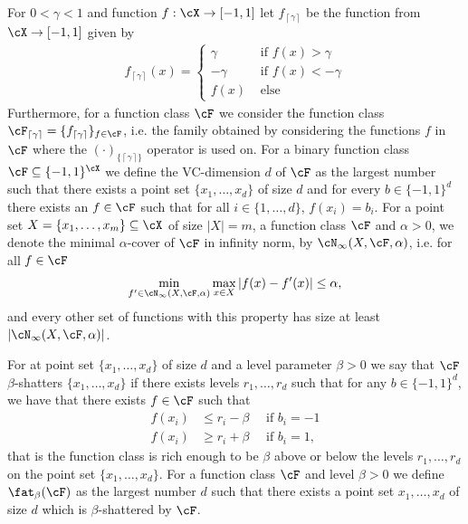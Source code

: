 For $0< \gamma <1$ and function $ f:\cX\rightarrow [-1,1] $ let $ f_{\left\lceil\gamma\right\rceil} $ be the function from $ \cX\rightarrow [-1,1] $ given by
    \begin{align}
        f_{\left\lceil\gamma\right\rceil}(x)=\begin{cases}
            \gamma &\text{ if }f(x)> \gamma
            \\
            -\gamma &\text{ if } f(x)<- \gamma
            \\
            f(x) &\text{ else }
        \end{cases}
    \end{align}   
    Furthermore, for a function class $ \cF $ we  consider the function class $ \cF_{\left\lceil\gamma\right\rceil} =\{  f_{\left\lceil\gamma\right\rceil}\}_{f\in \cF}$, i.e. the family obtained by considering the functions $ f $  in $ \cF $ where the $ (\cdot)_{\{ \left\lceil\gamma\right\rceil \}} $  operator is used on.
    For a binary function class $ \cF\subseteq \{  -1,1\}^{\cX}  $ we define the VC-dimension $ d $ of $ \cF $ as the largest number such that there exists a point set $ \{  x_{1},\ldots,x_{d}\}  $ of size $ d $ and for every $ b\in \{  -1,1\}^{d}  $ there exists an $ f\in\cF $ such that for all $ i\in\{  1,\ldots,d\}  $,  $ f(x_{i}) =b_{i}$.      
    For a point set $ X=\{  x_{1},\ldots,x_{m}\}  \subseteq \cX $ of size $ |X|=m $, a function class $ \cF $ and $ \alpha>0 $,  we denote the minimal $ \alpha$-cover of $ \cF $ in infinity norm, by $\cN_{\infty}(X,\cF ,\alpha)  $, i.e. for all $ f\in \cF $ 
    \begin{align}
        \min_{f'\in\cN_{\infty}(X,\cF ,\alpha)   }\max_{x\in X}  \left| f(x)-f'(x) \right| \leq \alpha, 
    \end{align}
    and every other set of functions with this property has size at least $  \left| \cN_{\infty}(X,\cF ,\alpha)  \right|  $.

    For at point set $\{  x_{1},\ldots,x_d\} $ of size $ d $ and a level parameter $ \beta>0 $ we say that $ \cF $ $ \beta $-shatters     $ \{  x_{1},\ldots,x_d\} $ if there exists levels $ r_1,\ldots,r_{d} $ such that for any $ b\in \{  -1,1\}^{d} $, we have that there exists $ f\in \cF $ such that 
    \begin{align*}
        f(x_i)&\leq r_{i}-\beta  \quad \text{ if  } b_{i}=-1
        \\
        f(x_i)&\geq r_{i}+\beta  \quad \text{ if  } b_{i}=1,
    \end{align*}
    that is the function class is rich enough to be $ \beta $  above or below the levels $ r_{1},\ldots,r_{d} $ on the point set $ \{  x_{1},\ldots,x_d\}.$  
    For a function class $ \cF $ and level $ \beta>0 $  we define $ \fat_{\beta}(\cF) $  as the largest number $ d $  such that there exists a point set $ x_{1},\ldots,x_{d}   $ of size $ d $ which is $ \beta $-shattered by $ \cF $.

